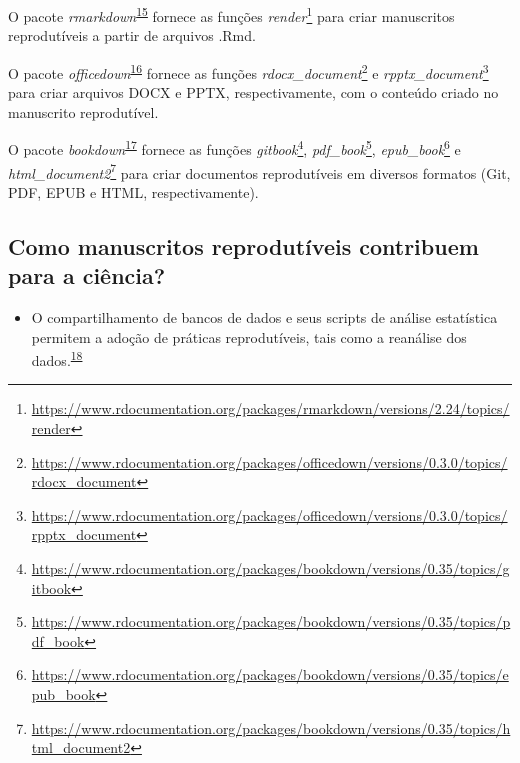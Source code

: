 \documentclass[
  a4paper,
]{book}
\providecommand{\tightlist}{%
  \setlength{\itemsep}{0pt}\setlength{\parskip}{0pt}}
\renewcommand{\href}[2]{#2\footnote{\url{#1}}}
\newenvironment{infobox}[1]
  {
  \begin{itemize}
  \renewcommand{\labelitemi}{
    \raisebox{-.7\height}[0pt][0pt]{
      {\setkeys{Gin}{width=3em,keepaspectratio}
        \texttt{[image: \#1]}}
    }
  }
  \setlength{\fboxsep}{1em}
  \begin{blackbox}
  \item
  }
  {
  \end{blackbox}
  \end{itemize}
  }
\begin{document}
\begin{infobox}{images/Rlogo}
O pacote \emph{rmarkdown}\textsuperscript{\protect\hyperlink{ref-rmarkdown}{15}} fornece as funções \href{https://www.rdocumentation.org/packages/rmarkdown/versions/2.24/topics/render}{\emph{render}} para criar manuscritos reprodutíveis a partir de arquivos .Rmd.

\end{infobox}

\begin{infobox}{images/Rlogo}
O pacote \emph{officedown}\textsuperscript{\protect\hyperlink{ref-officedown}{16}} fornece as funções \href{https://www.rdocumentation.org/packages/officedown/versions/0.3.0/topics/rdocx_document}{\emph{rdocx\_document}} e \href{https://www.rdocumentation.org/packages/officedown/versions/0.3.0/topics/rpptx_document}{\emph{rpptx\_document}} para criar arquivos DOCX e PPTX, respectivamente, com o conteúdo criado no manuscrito reprodutível.

\end{infobox}

\begin{infobox}{images/Rlogo}
O pacote \emph{bookdown}\textsuperscript{\protect\hyperlink{ref-bookdown-2}{17}} fornece as funções \href{https://www.rdocumentation.org/packages/bookdown/versions/0.35/topics/gitbook}{\emph{gitbook}}, \href{https://www.rdocumentation.org/packages/bookdown/versions/0.35/topics/pdf_book}{\emph{pdf\_book}}, \href{https://www.rdocumentation.org/packages/bookdown/versions/0.35/topics/epub_book}{\emph{epub\_book}} e \href{https://www.rdocumentation.org/packages/bookdown/versions/0.35/topics/html_document2}{\emph{html\_document2}} para criar documentos reprodutíveis em diversos formatos (Git, PDF, EPUB e HTML, respectivamente).

\end{infobox}

\hypertarget{como-manuscritos-reprodutuxedveis-contribuem-para-a-ciuxeancia}{%
\subsection{Como manuscritos reprodutíveis contribuem para a ciência?}\label{como-manuscritos-reprodutuxedveis-contribuem-para-a-ciuxeancia}}

\begin{itemize}
\tightlist
\item
  O compartilhamento de bancos de dados e seus scripts de análise estatística permitem a adoção de práticas reprodutíveis, tais como a reanálise dos dados.\textsuperscript{\protect\hyperlink{ref-ioannidis2014}{18}}
\end{itemize}
\end{document}
